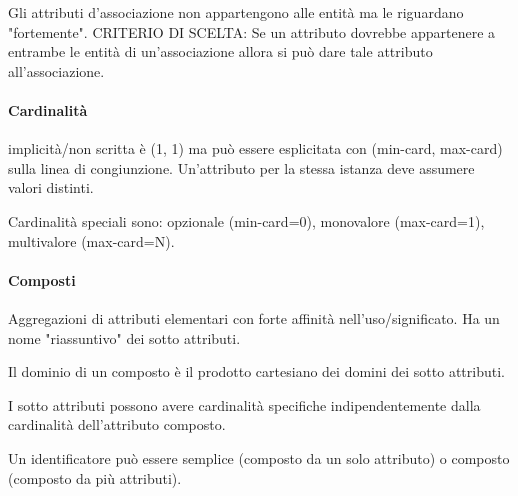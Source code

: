 Gli attributi d'associazione non appartengono alle entità ma le riguardano "fortemente". CRITERIO DI SCELTA: Se un attributo dovrebbe appartenere a entrambe le entità di un'associazione allora si può dare tale attributo all'associazione.

\paragraph{Cardinalità} implicità/non scritta è (1, 1) ma può essere esplicitata con (min-card, max-card) sulla linea di congiunzione.  Un'attributo per la stessa istanza deve assumere valori distinti.

Cardinalità speciali sono: opzionale (min-card=0), monovalore (max-card=1), multivalore (max-card=N).
\paragraph{Composti} Aggregazioni di attributi elementari con forte affinità nell'uso/significato. Ha un nome "riassuntivo" dei sotto attributi.

Il dominio di un composto è il prodotto cartesiano dei domini dei sotto attributi.

I sotto attributi possono avere cardinalità specifiche indipendentemente dalla cardinalità dell'attributo composto.

Un identificatore può essere semplice (composto da un solo attributo) o composto (composto da più attributi).
